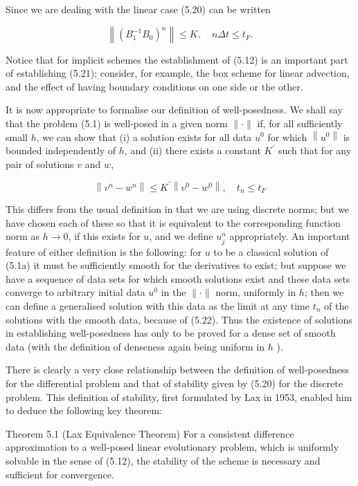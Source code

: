 \documentclass[10pt]{article}
\begin{document}
Since we are dealing with the linear case (5.20) can be written

\[
\left\|\left(B_{1}^{-1} B_{0}\right)^{n}\right\| \leq K, \quad n \Delta t \leq t_{F} .
\]

Notice that for implicit schemes the establishment of (5.12) is an important part of establishing (5.21); consider, for example, the box scheme for linear advection, and the effect of having boundary conditions on one side or the other.

It is now appropriate to formalise our definition of well-posedness. We shall say that the problem (5.1) is well-posed in a given norm \(\|\cdot\|\) if, for all sufficiently small \(h\), we can show that (i) a solution exists for all data \(u^{0}\) for which \(\left\|u^{0}\right\|\) is bounded independently of \(h\), and (ii) there exists a constant \(K^{\prime}\) such that for any pair of solutions \(v\) and \(w\),

\[
\left\|v^{n}-w^{n}\right\| \leq K^{\prime}\left\|v^{0}-w^{0}\right\|, \quad t_{n} \leq t_{F}
\]

This differs from the usual definition in that we are using discrete norms; but we have chosen each of these so that it is equivalent to the corresponding function norm as \(h \rightarrow 0\), if this exists for \(u\), and we define \(u_{j}^{n}\) appropriately. An important feature of either definition is the following: for \(u\) to be a classical solution of (5.1a) it must be sufficiently smooth for the derivatives to exist; but suppose we have a sequence of data sets for which smooth solutions exist and these data sets converge to arbitrary initial data \(u^{0}\) in the \(\|\cdot\|\) norm, uniformly in \(h\); then we can define a generalised solution with this data as the limit at any time \(t_{n}\) of the\\
solutions with the smooth data, because of (5.22). Thus the existence of solutions in establishing well-posedness has only to be proved for a dense set of smooth data (with the definition of denseness again being uniform in \(h\) ).

There is clearly a very close relationship between the definition of well-posedness for the differential problem and that of stability given by (5.20) for the discrete problem. This definition of stability, first formulated by Lax in 1953, enabled him to deduce the following key theorem:

Theorem 5.1 (Lax Equivalence Theorem) For a consistent difference approximation to a well-posed linear evolutionary problem, which is uniformly solvable in the sense of (5.12), the stability of the scheme is necessary and sufficient for convergence.
\end{document}
